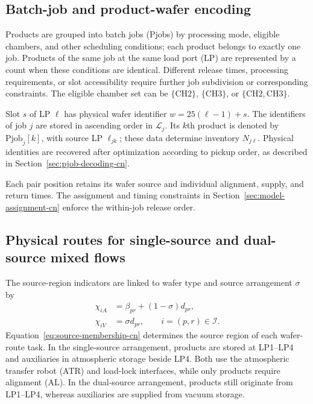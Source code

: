 \documentclass[final,5p,times,twocolumn]{elsarticle}
\begin{document}
\subsection{Batch-job and product-wafer encoding}
\label{sec:model-encoding-cn}
Products are grouped into batch jobs (Pjobs) by processing mode, eligible chambers, and other scheduling conditions; each product belongs to exactly one job. Products of the same job at the same load port (LP) are represented by a count when these conditions are identical. Different release times, processing requirements, or slot accessibility require further job subdivision or corresponding constraints. The eligible chamber set can be $\{\mathrm{CH2}\}$, $\{\mathrm{CH3}\}$, or $\{\mathrm{CH2},\mathrm{CH3}\}$.

Slot $s$ of LP $\ell$ has physical wafer identifier $w=25(\ell-1)+s$. The identifiers of job $j$ are stored in ascending order in $\mathcal L_j$. Its $k$th product is denoted by $\mathrm{Pjob}_j[k]$, with source LP $\ell_{jk}$; these data determine inventory $N_{j\ell}$. Physical identities are recovered after optimization according to pickup order, as described in Section~\ref{sec:pjob-decoding-cn}.

Each pair position retains its wafer source and individual alignment, supply, and return times. The assignment and timing constraints in Section~\ref{sec:model-assignment-cn} enforce the within-job release order.

\subsection{Physical routes for single-source and dual-source mixed flows}
\label{sec:model-path-cn}
The source-region indicators are linked to wafer type and source arrangement $\sigma$ by
\begin{equation}
\begin{aligned}
\chi_{iA}&=\beta_{pr}+(1-\sigma)d_{pr},\\
\chi_{iV}&=\sigma d_{pr},\qquad i=(p,r)\in\mathcal I.
\end{aligned}
\label{eq:source-membership-cn}
\end{equation}
Equation~\eqref{eq:source-membership-cn} determines the source region of each wafer-route task. In the single-source arrangement, products are stored at LP1--LP4 and auxiliaries in atmospheric storage beside LP4. Both use the atmospheric transfer robot (ATR) and load-lock interfaces, while only products require alignment (AL). In the dual-source arrangement, products still originate from LP1--LP4, whereas auxiliaries are supplied from vacuum storage.
\end{document}
